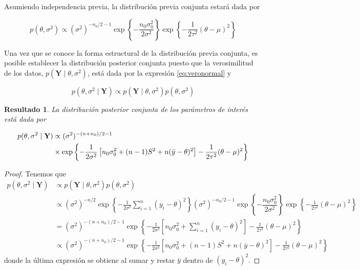 \documentclass[
  10pt,
  spanish,
]{book}
\newtheorem{proposition}{Resultado}[chapter]
\theoremstyle{definition}
\theoremstyle{definition}
\theoremstyle{definition}
\theoremstyle{definition}
\theoremstyle{remark}
\begin{document}
Asumiendo independencia previa, la distribución previa conjunta estará dada por

\begin{equation}
p(\theta,\sigma^2)\propto (\sigma^2)^{-n_0/2-1}\exp\left\{-\dfrac{n_0\sigma^2_0}{2\sigma^2}\right\}
\exp\left\{-\frac{1}{2\tau^2}(\theta-\mu)^2\right\}
\end{equation}

Una vez que se conoce la forma estructural de la distribución previa conjunta, es posible establecer la distribución posterior conjunta puesto que la verosimilitud de los datos, \(p(\mathbf{Y} \mid \theta,\sigma^2)\), está dada por la expresión \eqref{eq:veronormal} y

\begin{equation*}
p(\theta,\sigma^2 \mid \mathbf{Y})\propto p(\mathbf{Y} \mid \theta,\sigma^2)p(\theta,\sigma^2)
\end{equation*}

\begin{proposition}
\protect\hypertarget{prp:unnamed-chunk-1}{}{\label{prp:unnamed-chunk-1} }La distribución posterior conjunta de los parámetros de interés está dada por

\begin{align}
p(\theta,\sigma^2 \mid \mathbf{Y})&\propto (\sigma^2)^{-(n+n_0)/2-1} \notag \\
&\times
\exp\left\{-\frac{1}{2\sigma^2}\left[n_0\sigma^2_0+(n-1)S^2+n(\bar{y}-\theta)^2\right]-\frac{1}{2\tau^2}(\theta-\mu)^2\right\}
\end{align}
\end{proposition}

\begin{proof}
{}Tenemos que
\begin{align*}
p(\theta,\sigma^2 \mid \mathbf{Y})&\propto p(\mathbf{Y} \mid \theta,\sigma^2)p(\theta,\sigma^2)\\
&\propto(\sigma^2)^{-n/2}\exp\left\{-\frac{1}{2\sigma^2}\sum_{i=1}^n(y_i-\theta)^2\right\}(\sigma^2)^{-n_0/2-1}\exp\left\{-\dfrac{n_0\sigma^2_0}{2\sigma^2}\right\}
\exp\left\{-\frac{1}{2\tau^2}(\theta-\mu)^2\right\} \\
&=(\sigma^2)^{-(n+n_0)/2-1}\exp\left\{-\frac{1}{2\sigma^2}\left[n_0\sigma^2_0+\sum_{i=1}^n(y_i-\theta)^2\right]-\frac{1}{2\tau^2}(\theta-\mu)^2\right\}\\
&\propto (\sigma^2)^{-(n+n_0)/2-1}\exp\left\{-\frac{1}{2\sigma^2}\left[n_0\sigma^2_0+(n-1)S^2+n(\bar{y}-\theta)^2\right]-\frac{1}{2\tau^2}(\theta-\mu)^2\right\}
\end{align*}
donde la última expresión se obtiene al sumar y restar \(\bar{y}\) dentro de \((y_i-\theta)^2\).
\end{proof}
\end{document}
